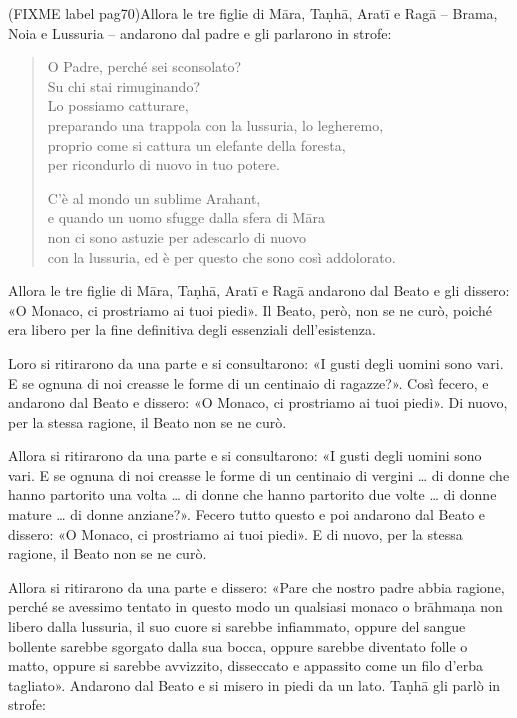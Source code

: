 (FIXME label pag70)Allora le tre figlie di Māra, Taṇhā, Aratī e Ragā – Brama, Noia e
Lussuria – andarono dal padre e gli parlarono in strofe:


\begin{quotation}
O Padre, perché sei sconsolato? \\
Su chi stai rimuginando? \\
Lo possiamo catturare, \\
preparando una trappola con la lussuria, lo legheremo, \\
proprio come si cattura un elefante della foresta, \\
per ricondurlo di nuovo in tuo potere.


C’è al mondo un sublime Arahant, \\
e quando un uomo sfugge dalla sfera di Māra \\
non ci sono astuzie per adescarlo di nuovo \\
con la lussuria, ed è per questo che sono così addolorato.
\end{quotation}

Allora le tre figlie di Māra, Taṇhā, Aratī e Ragā andarono dal Beato e
gli dissero: «O Monaco, ci prostriamo ai tuoi piedi». Il Beato, però,
non se ne curò, poiché era libero per la fine definitiva degli
essenziali dell’esistenza.


Loro si ritirarono da una parte e si consultarono: «I gusti degli uomini
sono vari. E se ognuna di noi creasse le forme di un centinaio di
ragazze?». Così fecero, e andarono dal Beato e dissero: «O Monaco, ci
prostriamo ai tuoi piedi». Di nuovo, per la stessa ragione, il Beato non
se ne curò.


Allora si ritirarono da una parte e si consultarono: «I gusti degli
uomini sono vari. E se ognuna di noi creasse le forme di un centinaio di
vergini …​ di donne che hanno partorito una volta …​ di donne che
hanno partorito due volte …​ di donne mature …​ di donne anziane?».
Fecero tutto questo e poi andarono dal Beato e dissero: «O Monaco, ci
prostriamo ai tuoi piedi». E di nuovo, per la stessa ragione, il Beato
non se ne curò.


Allora si ritirarono da una parte e dissero: «Pare che nostro padre
abbia ragione, perché se avessimo tentato in questo modo un qualsiasi
monaco o brāhmaṇa non libero dalla lussuria, il suo cuore si sarebbe
infiammato, oppure del sangue bollente sarebbe sgorgato dalla sua bocca,
oppure sarebbe diventato folle o matto, oppure si sarebbe avvizzito,
disseccato e appassito come un filo d’erba tagliato». Andarono dal Beato
e si misero in piedi da un lato. Taṇhā gli parlò in strofe:


